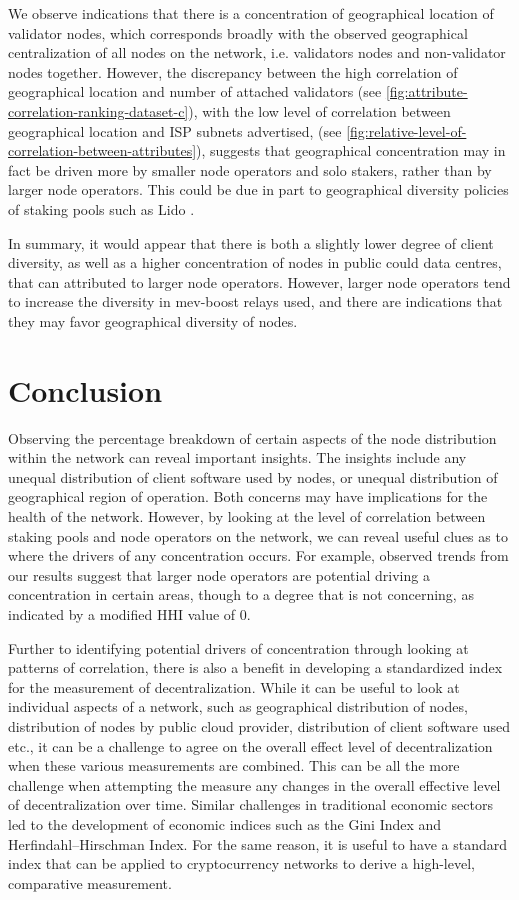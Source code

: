 \documentclass[conference]{IEEEtran}
\begin{document}
We observe indications that there is a concentration of geographical location of validator nodes, which corresponds broadly with the observed geographical centralization of all nodes on the network, i.e. validators nodes and non-validator nodes together. However, the discrepancy between the high correlation of geographical location and number of attached validators (see \ref{fig:attribute-correlation-ranking-dataset-c}), with the low level of correlation between geographical location and ISP subnets advertised, (see \ref{fig:relative-level-of-correlation-between-attributes}), suggests that geographical concentration may in fact be driven more by smaller node operators and solo stakers, rather than by larger node operators.  This could be due in part to geographical diversity policies of staking pools such as Lido \cite{vanom2024}.

In summary, it would appear that there is both a slightly lower degree of client diversity, as well as a higher concentration of nodes in public could data centres, that can attributed to larger node operators.  However, larger node operators tend to increase the diversity in mev-boost relays used, and there are indications that they may favor geographical diversity of nodes.

\section{Conclusion}
\label{sec:conclusion}

Observing the percentage breakdown of certain aspects of the node distribution within the network can reveal important insights.  The insights include any unequal distribution of client software used by nodes, or unequal distribution of geographical region of operation.  Both concerns may have implications for the health of the network.  However, by looking at the level of correlation between staking pools and node operators on the network, we can reveal useful clues as to where the drivers of any concentration occurs.  For example, observed trends from our results suggest that larger node operators are potential driving a concentration in certain areas, though to a degree that is not concerning, as indicated by a modified HHI value of 0.

Further to identifying potential drivers of concentration through looking at patterns of correlation, there is also a benefit in developing a standardized index for the measurement of decentralization.  While it can be useful to look at individual aspects of a network, such as geographical distribution of nodes, distribution of nodes by public cloud provider, distribution of client software used etc., it can be a challenge to agree on the overall effect level of decentralization when these various measurements are combined.  This can be all the more challenge when attempting the measure any changes in the overall effective level of decentralization over time.  Similar challenges in traditional economic sectors led to the development of economic indices such as the Gini Index and Herfindahl–Hirschman Index.  For the same reason, it is useful to have a standard index that can be applied to cryptocurrency networks to derive a high-level, comparative measurement.
\end{document}
